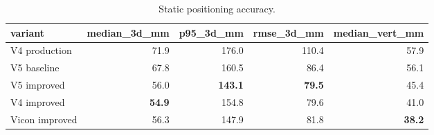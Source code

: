 \begin{table}[t]
\centering
\caption{Static positioning accuracy.}
\label{tab:static_accuracy}
\begin{tabular}{lrrrr}
\hline
variant & median\_3d\_mm & p95\_3d\_mm & rmse\_3d\_mm & median\_vert\_mm \\
\hline
V4 production & 71.9 & 176.0 & 110.4 & 57.9 \\
V5 baseline & 67.8 & 160.5 & 86.4 & 56.1 \\
V5 improved & 56.0 & \textbf{143.1} & \textbf{79.5} & 45.4 \\
V4 improved & \textbf{54.9} & 154.8 & 79.6 & 41.0 \\
Vicon improved & 56.3 & 147.9 & 81.8 & \textbf{38.2} \\
\hline
\end{tabular}
\end{table}
